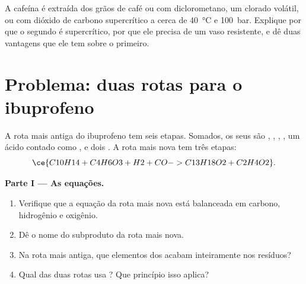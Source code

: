 \begin{exercise}[$\star\star\star$]\label{exo:g12:synthesis-strategy:15}
A cafeína é extraída dos grãos de café ou com diclorometano, um 
clorado volátil, ou com dióxido de carbono supercrítico a cerca de
\qty{40}{\celsius} e \qty{100}{bar}. Explique por que o segundo é
supercrítico, por que ele precisa de um vaso resistente, e dê duas
vantagens que ele tem sobre o primeiro.
\end{exercise}

\section{Problema: duas rotas para o ibuprofeno}

\begin{problem}
\label{pb:g12:synthesis-strategy:1}
A rota mais antiga do ibuprofeno  tem seis etapas. Somados,
os seus  são , , ,
, um ácido contado como ,  e dois
. A rota mais nova tem três etapas:
\[
  \ce{C10H14 + C4H6O3 + H2 + CO -> C13H18O2 + C2H4O2} .
\]

\medskip
\noindent\textbf{Parte I --- As equações.}
\begin{enumerate}
  \item Verifique que a equação da rota mais nova está balanceada em
        carbono, hidrogênio e oxigênio.
  \item Dê o nome do subproduto da rota mais nova.
  \item Na rota mais antiga, que elementos dos  acabam
        inteiramente nos resíduos?
  \item Qual das duas rotas usa ? Que princípio isso
        aplica?
\end{enumerate}


\end{problem}
